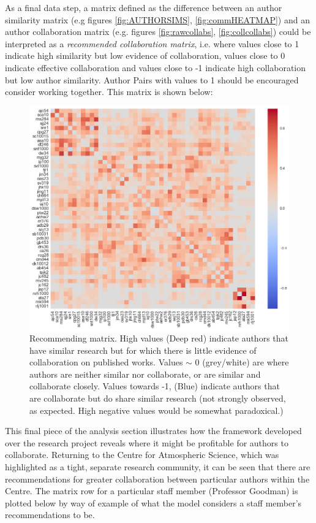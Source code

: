 As a final data step, a matrix defined as the difference between an author similarity matrix (e.g figures \ref{fig:AUTHORSIMS}, \ref{fig:commHEATMAP}) and an author collaboration matrix (e.g. figures \ref{fig:rawcollabs}, \ref{fig:collcollabs}) could be interpreted as a \emph{recommended collaboration matrix}, i.e. where values close to 1 indicate high similarity but low evidence of collaboration, values close to 0 indicate effective collaboration and values close to -1 indicate high collaboration but low author similarity. Author Pairs with values to 1 should be encouraged consider working together. This matrix is shown below:
\begin{center}
\begin{figure}[H]
\label{fig:RECOMM_MAT}
  \centering
    \includegraphics[width=\textwidth]{Analysis/Recommending_Mat.png}
    \caption{Recommending matrix. High values (Deep red) indicate authors that have similar research but for which there is little evidence of collaboration on published works. Values $\sim$ 0 (grey/white) are where authors are neither similar nor collaborate, or are similar and collaborate closely. Values towards -1, (Blue) indicate authors that are collaborate but do share similar research (not strongly observed, as expected. High negative values would be somewhat paradoxical.) }
\end{figure} 
\end{center}
This final piece of the analysis section illustrates how the framework developed over the research project reveals where it might be profitable for authors to collaborate. Returning to the Centre for Atmospheric Science, which was highlighted as a tight, separate research community, it can be seen that there are recommendations for greater collaboration between particular authors within the Centre. The matrix row for a particular staff member (Professor Goodman) is plotted below by way of example of what the model considers a staff member's recommendations to be.

